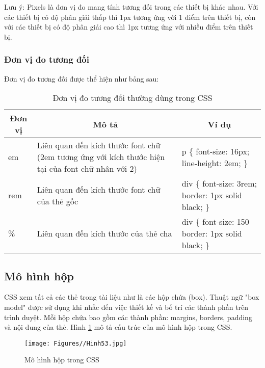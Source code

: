 Lưu ý: Pixels là đơn vị đo mang tính tương đối trong các thiết bị khác nhau. Với các thiết bị có độ phân giải thấp thì 1px tương ứng với 1 điểm trên thiết bị, còn với các thiết bị có độ phân giải cao thì 1px tương ứng với nhiều điểm trên thiết bị.

\subsubsection{Đơn vị đo tương đối}
Đơn vị đo tương đối được thể hiện như bảng sau:
\begin{center}

 \begin{longtable}{|m{2cm}|m{5cm}| m{4cm}|}
  \caption [Đơn vị đo tương đối thường dùng trong CSS]{ Đơn vị đo tương đối thường dùng trong CSS }
   \endfirsthead
   \endhead
  
 \hline
\multicolumn{1}{|c|}{\textbf{Đơn vị}}
 &
 \multicolumn{1}{|c|}{
\textbf{	Mô tả}}
 &	
\multicolumn{1}{|c|}{\textbf{Ví dụ}}
 \\ \hline
em &	Liên quan đến kích thước font chữ (2em tương ứng với kích thước hiện tại của font chữ nhân với 2) &	p \{
  font-size: 16px;
  line-height: 2em;
\} \\ \hline

rem &	Liên quan đến kích thước font chữ của thẻ gốc &	div \{
  font-size: 3rem;
  border: 1px solid black;
\}\\ \hline

\% &	Liên quan đến kích thước của thẻ cha &	div \{
  font-size: 150%
  border: 1px solid black;
\}\\ \hline

\end{longtable}
\end{center}
\vspace{-1cm}
\subsection {Mô hình hộp}
CSS xem tất cả các thẻ trong tài liệu như là các hộp chứa (box). Thuật ngữ "box model" được sử dụng khi nhắc đến việc thiết kế và bố trí các thành phần trên trình duyệt. Mỗi hộp chứa bao gồm các thành phần:  margins, borders, padding và nội dung của thẻ. Hình \ref{hinh53} mô tả cấu trúc của mô hình hộp trong CSS.
\begin{figure}[!ht]
\centering
\texttt{[image: Figures//Hinh53.jpg]}
\caption{ Mô hình hộp trong CSS }\label{hinh53} 
\end{figure}

